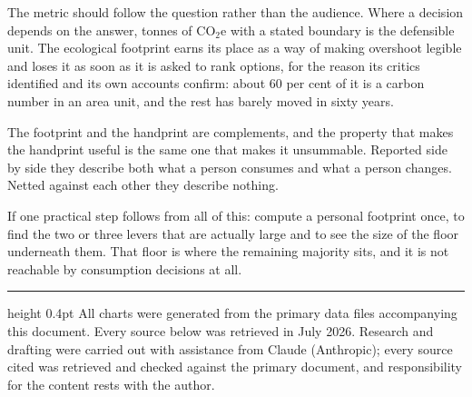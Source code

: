 \documentclass[11pt,a4paper]{article}
\begin{document}
The metric should follow the question rather than the audience. Where a decision
depends on the answer, tonnes of CO$_2$e with a stated boundary is the defensible
unit. The ecological footprint earns its place as a way of making overshoot legible
and loses it as soon as it is asked to rank options, for the reason its critics
identified and its own accounts confirm: about 60 per cent of it is a carbon number
in an area unit, and the rest has barely moved in sixty years.

The footprint and the handprint are complements, and the property that makes the
handprint useful is the same one that makes it unsummable. Reported side by side they
describe both what a person consumes and what a person changes. Netted against each
other they describe nothing.

If one practical step follows from all of this: compute a personal footprint once, to
find the two or three levers that are actually large and to see the size of the floor
underneath them. That floor is where the remaining majority sits, and it is not
reachable by consumption decisions at all.

\vspace{10pt}
\hrule height 0.4pt
\vspace{4pt}
{\footnotesize\color{gray}All charts were generated from the primary data files
accompanying this document. Every source below was retrieved in July 2026. Research
and drafting were carried out with assistance from Claude (Anthropic); every source
cited was retrieved and checked against the primary document, and responsibility for
the content rests with the author.}
\end{document}
